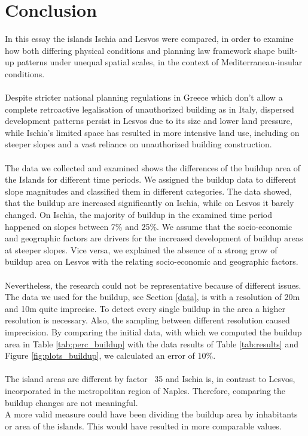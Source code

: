 \documentclass[10pt, twocolumn, twoside]{article}
\begin{document}
\section{Conclusion}\label{Conclusion}
In this essay the islands Ischia and Lesvos were compared, in order to examine how both differing physical conditions and planning law framework shape built-up patterns under unequal spatial scales, in the context of Mediterranean-insular conditions.\\\\
Despite stricter national planning regulations in Greece which don’t allow a complete retroactive legalisation of unauthorized building as in Italy, dispersed development patterns persist in Lesvos due to its size and lower land pressure, while Ischia’s limited space has resulted in more intensive land use, including on steeper slopes and a vast reliance on unauthorized building construction.
\\\\
The data we collected and examined shows the differences of the buildup area of the Islands for different time periods. We assigned the buildup data to different slope magnitudes and classified them in different categories. The data showed, that the buildup are increased significantly on Ischia, while on Lesvos it barely changed. On Ischia, the majority of buildup in the examined time period happened on slopes between 7\% and 25\%.  We assume that the socio-economic and geographic factors are drivers for the increased development of buildup areas at steeper slopes. Vice versa, we explained the absence of a strong grow of buildup area on Lesvos with the relating socio-economic and geographic factors.\\\\
Nevertheless, the research could not be representative because of different issues.\\
The data we used for the buildup, see Section \ref{data}, is with a resolution of 20m and 10m quite imprecise. To detect every single buildup in the area a higher resolution is necessary. Also, the sampling between different resolution caused imprecision. By comparing the initial data, with which we computed the buildup area in Table \ref{tab:perc_buildup} with the data results of Table \ref{tab:results} and Figure \ref{fig:plots_buildup}, we calculated an error of 10\%. \\\\
The island areas are different by factor ~35 and Ischia is, in contrast to Lesvos, incorporated in the metropolitan region of Naples. Therefore, comparing the buildup changes are not meaningful. \\A more valid measure could have been dividing the buildup area by inhabitants or area of the islands. This would have resulted in more comparable values.\\\\
\end{document}
